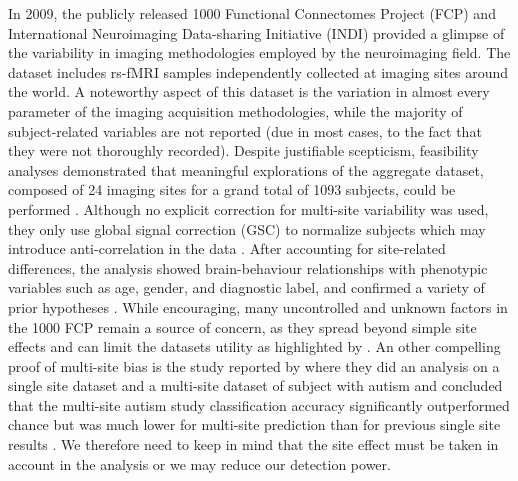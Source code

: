 In 2009, the publicly released 1000 Functional Connectomes Project (FCP) and International Neuroimaging Data-sharing Initiative (INDI) provided a glimpse of the variability in imaging methodologies employed by the neuroimaging field. The dataset includes rs-fMRI samples independently collected at imaging sites around the world. A noteworthy aspect of this dataset is the variation in almost every parameter of the imaging acquisition methodologies, while the majority of subject-related variables are not reported (due in most cases, to the fact that they were not thoroughly recorded). 
Despite justifiable scepticism, feasibility analyses demonstrated that meaningful explorations of the aggregate dataset, composed of 24 imaging sites for a grand total of 1093 subjects, could be performed \citep{Biswal2010}. Although no explicit correction for multi-site variability was used, they only use global signal correction (GSC) to normalize subjects which may introduce anti-correlation in the data \citep{Fox2009, Murphy2009, Saad2012, Carbonell2014, Power2014}. After accounting for site-related differences, the analysis showed brain-behaviour relationships with phenotypic variables such as age, gender, and diagnostic label, and confirmed a variety of prior hypotheses \citep{Biswal2010, Fair2012, Tomasi2010, Zuo2012}. While encouraging, many uncontrolled and unknown factors in the 1000 FCP remain a source of concern, as they spread beyond simple site effects and can limit the datasets utility as highlighted by \cite{Yan2013}.
An other compelling proof of multi-site bias is the study reported by \cite{Nielsen2013} where they did an analysis on a single site dataset and a multi-site dataset of subject with autism and concluded that the multi-site autism study classification accuracy significantly outperformed chance but was much lower for multi-site prediction than for previous single site results \citep{Nielsen2013}. We therefore need to keep in mind that the site effect must be taken in account in the analysis or we may reduce our detection power.


